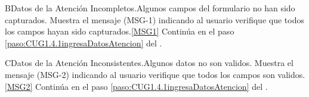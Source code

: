 	\begin{UCtrayectoriaA}{B}{Datos de la Atención Incompletos.}{Algunos campos del formulario no han sido capturados.}
			\UCpaso Muestra el mensaje (MSG-1) indicando al usuario verifique que todos los campos hayan sido capturados.\ref{MSG1}
			\UCpaso Continúa en el paso \ref{paso:CUG1.4.1ingresaDatosAtencion} del .
	\end{UCtrayectoriaA}

	\begin{UCtrayectoriaA}{C}{Datos de la Atención Inconsistentes.}{Algunos datos no son validos.}
			\UCpaso Muestra el mensaje (MSG-2) indicando al usuario verifique que todos los campos son validos.\ref{MSG2}
			\UCpaso Continúa en el paso \ref{paso:CUG1.4.1ingresaDatosAtencion} del .
	\end{UCtrayectoriaA}